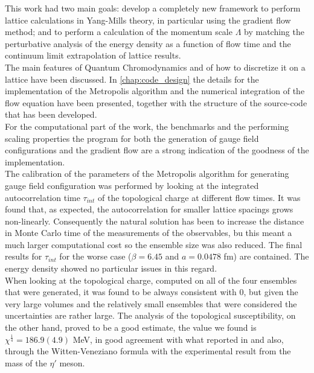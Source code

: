 This work had two main goals: develop a completely new framework to perform lattice calculations in Yang-Mills theory, in particular using the gradient flow method; and to perform a calculation of the momentum scale $\Lambda$ by matching the perturbative analysis of the energy density as a function of flow time and the continuum limit extrapolation of lattice results.\\

The main features of Quantum Chromodynamics and of how to discretize it on a lattice have been discussed. In \cref{chap:code_design} the details for the implementation of the Metropolis algorithm and the numerical integration of the flow equation have been presented, together with the structure of the source-code that has been developed. \\
For the computational part of the work, the benchmarks and the performing scaling properties the program for both the generation of gauge field configurations and the gradient flow are a strong indication of the goodness of the implementation. \\
The calibration of the parameters of the Metropolis algorithm for generating gauge field configuration was performed by looking at the integrated autocorrelation time $\tau_{int}$ of the topological charge at different flow times. It was found that, as expected, the autocorrelation  for smaller lattice spacings grows non-linearly. Consequently the natural solution has been to increase the distance in Monte Carlo time of the measurements of the observables, bu this meant a much larger computational cost so the ensemble size was also reduced. The final results for $\tau_{int}$ for the worse case ($\beta = 6.45$ and $a=0.0478$ fm) are contained. The energy density showed no particular issues in this regard.\\
When looking at the topological charge, computed on all of the four ensembles that were generated, it was found to be always consistent with 0, but given the very large volumes and the relatively small ensembles that were considered the uncertainties are rather large. The analysis of the topological susceptibility, on the other hand, proved to be a good estimate, the value we found is $\chi^{\frac{1}{4}} = 186.9(4.9)$ MeV, in good agreement with what reported in \cite{luscher_properties_2010,shindler_nucleon_2015} and also, through the Witten-Veneziano formula with the experimental result from the mass of the $\eta'$ meson.\\

